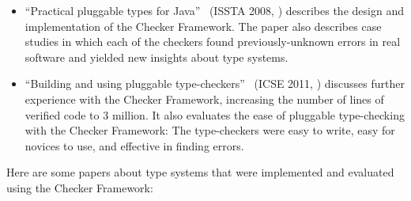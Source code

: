 \begin{itemize}
\item
``Practical pluggable types for Java''~\cite{PapiACPE2008}
(ISSTA 2008, )
describes the design and implementation of the Checker Framework.
The paper also describes case
studies in which each of the checkers found
previously-unknown errors in real software
and yielded new insights about type systems.

\item
``Building and using pluggable
type-checkers''~\cite{DietlDEMS2011}
(ICSE 2011, )
discusses further experience with the Checker Framework, increasing the
number of lines of verified code to 3 million.  It also evaluates the ease
of pluggable type-checking with the Checker Framework:  The type-checkers
were easy to write, easy for novices to use, and effective in finding
errors.
\end{itemize}

Here are some papers about type systems that were implemented and evaluated
using the Checker Framework:

